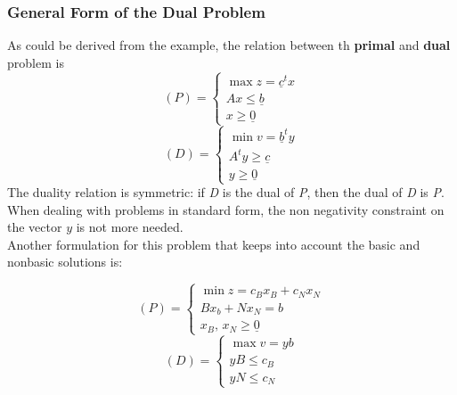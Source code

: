 \documentclass{article}
\begin{document}
			\subsubsection{General Form of the Dual Problem}
				As could be derived from the example, the relation between th \textbf{primal} and \textbf{dual} problem is
				\begin{equation}
					(P) = 
					\begin{cases}
						\max z = \underline{c}^tx \\
						Ax \leq \underline{b} \\
						x \geq \underline{0}
					\end{cases}
				\end{equation}
				\begin{equation}
					(D) = 
					\begin{cases}
						\min v = \underline{b}^ty \\
						A^ty \geq \underline{c} \\
						y \geq \underline{0}
					\end{cases}
				\end{equation}
				The duality relation is symmetric: if \emph{D} is the dual of \emph{P}, then the dual of \emph{D} is \emph{P}.\\
				When dealing with problems in standard form, the non negativity constraint on the vector $y$ is not more needed.\\
				Another formulation for this problem that keeps into account the basic and nonbasic solutions is:
				\begin{multicols}{2}
					\begin{equation}
						(P) = 
						\begin{cases}
							\min z = c_Bx_B + c_Nx_N \\
							Bx_b + Nx_N = b \\
							x_B,\, x_N \geq \underline{0}
						\end{cases}
					\end{equation}
					\break
					\begin{equation}
						(D) = 
						\begin{cases}
							\max v = yb \\
							yB \leq c_B \\
							yN \leq c_N
						\end{cases}
					\end{equation}
				\end{multicols}
\end{document}
